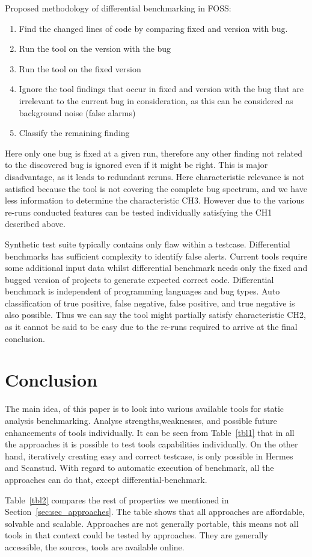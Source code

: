 \documentclass[authoryear,preprint]{sigplanconf}
\begin{document}
Proposed methodology of differential benchmarking in FOSS:
\begin{enumerate}
	\item Find the changed lines of code by comparing fixed and version with bug.
	\item Run the tool on the version with the bug
	\item Run the tool on the fixed version
	\item Ignore the tool findings that occur in fixed and version with the bug that are irrelevant to the current bug in consideration, as this can be considered as background noise (false alarms)
	\item Classify the remaining finding
\end{enumerate}

Here only one bug is fixed at a given run, therefore any other finding not related to the discovered bug is ignored even if it might be right. This is major disadvantage, as it leads to redundant reruns. Here characteristic relevance is not satisfied because the tool is not covering the complete bug spectrum, and we have less information to determine the characteristic CH3. However due to the various re-runs conducted features can be tested individually satisfying the CH1 described above.

Synthetic test suite typically contains only flaw within a testcase. Differential benchmarks has sufficient complexity to identify false alerts. Current tools require some additional input data whilst differential benchmark needs only the fixed and bugged version of projects to generate expected correct code. Differential benchmark is independent of programming languages and bug types. Auto classification of true positive, false negative, false positive, and true negative is also possible. Thus we can say the tool might partially satisfy characteristic CH2, as it cannot be said to be easy due to the re-runs required to arrive at the final conclusion.

\section{Conclusion}
\label{sec:conclusion}
The main idea, of this paper is to look into various available tools for static analysis benchmarking. Analyse strengths,weaknesses, and possible future enhancements of tools individually. 
It can be seen from Table~\ref{tbl1} that in all the approaches it is possible to test tools capabilities individually. On the other hand, iteratively creating easy and correct testcase, is only possible in Hermes and Scanstud. With regard to automatic execution of benchmark, all the approaches can do that, except differential-benchmark.

Table~\ref{tbl2} compares the rest of properties we mentioned in Section~\ref{sec:sec_approaches}. The table shows that all approaches are affordable, solvable and scalable. Approaches are not generally portable, this means not all tools in that context could be tested by approaches. They are generally accessible, the sources, tools are available online.  
 
	
	
	
	
\end{document}
